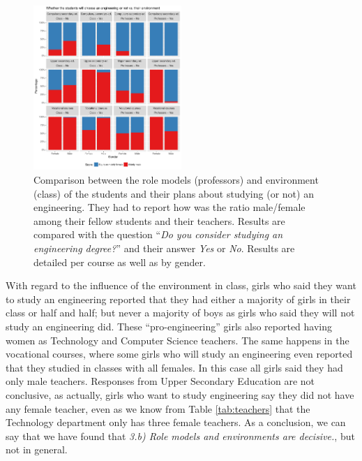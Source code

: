 \documentclass[journal,transmag]{IEEEtran}
\begin{document}
\begin{figure}
	\centering
	\includegraphics[width=0.5\textwidth]{img/future_vs_influence.pdf}
	\caption{Comparison between the role models (professors) and environment (class) of the students and their plans about studying (or not) an engineering. They had to report how was the ratio male/female among their fellow students and their teachers. Results are compared with the question ``\textit{Do you consider studying an engineering degree?}'' and their answer \textit{Yes} or \textit{No}. Results are detailed per course as well as by gender.}
	\label{fig:influences}
\end{figure}

With regard to the influence of the environment in class, girls who said they want to study an engineering reported that they had either a majority of girls in their class or half and half; but never a majority of boys as girls who said they will not study an engineering did. These ``pro-engineering'' girls also reported having women as Technology and Computer Science teachers. The same happens in the vocational courses, where some girls who will study an engineering even reported that they studied in classes with all females. In this case all girls said they had only male teachers. Responses from Upper Secondary Education are not conclusive, as actually, girls who want to study engineering say they did not have any female teacher, even as we know from Table \ref{tab:teachers} that the Technology department only has three female teachers. As a conclusion, we can say that we have found that \textit{3.b) Role models and environments are decisive.}, but not in general.
\end{document}
